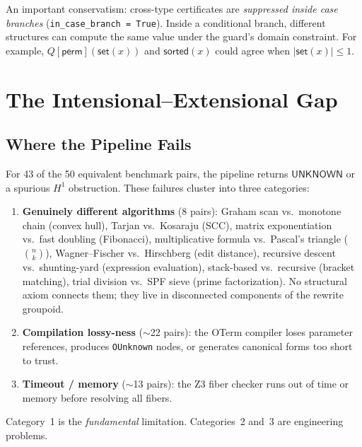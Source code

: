\documentclass[11pt,a4paper]{report}
\theoremstyle{definition}
\theoremstyle{plain}
\begin{document}
An important conservatism: cross-type certificates are
\emph{suppressed inside case branches}
(\texttt{in\_case\_branch = True}).  Inside a conditional branch,
different structures can compute the same value under the guard's
domain constraint.  For example, $Q[\mathsf{perm}](\mathsf{set}(x))$
and $\mathsf{sorted}(x)$ could agree when
$|\mathsf{set}(x)| \leq 1$.


\section{The Intensional--Extensional Gap}
\label{sec:int-ext-gap}

\subsection{Where the Pipeline Fails}

For 43 of the 50 equivalent benchmark pairs, the pipeline returns
$\mathsf{UNKNOWN}$ or a spurious $H^1$ obstruction.  These failures
cluster into three categories:

\begin{enumerate}
  \item \textbf{Genuinely different algorithms} (8 pairs):
    Graham scan vs.\ monotone chain (convex hull),
    Tarjan vs.\ Kosaraju (SCC),
    matrix exponentiation vs.\ fast doubling (Fibonacci),
    multiplicative formula vs.\ Pascal's triangle ($\binom{n}{k}$),
    Wagner--Fischer vs.\ Hirschberg (edit distance),
    recursive descent vs.\ shunting-yard (expression evaluation),
    stack-based vs.\ recursive (bracket matching),
    trial division vs.\ SPF sieve (prime factorization).
    No structural axiom connects them; they live in disconnected
    components of the rewrite groupoid.

  \item \textbf{Compilation lossy-ness} ($\sim$22 pairs):
    the OTerm compiler loses parameter references, produces
    \texttt{OUnknown} nodes, or generates canonical forms too
    short to trust.

  \item \textbf{Timeout / memory} ($\sim$13 pairs):
    the Z3 fiber checker runs out of time or memory before
    resolving all fibers.
\end{enumerate}

Category~1 is the \emph{fundamental} limitation.  Categories~2 and~3
are engineering problems.
\end{document}
